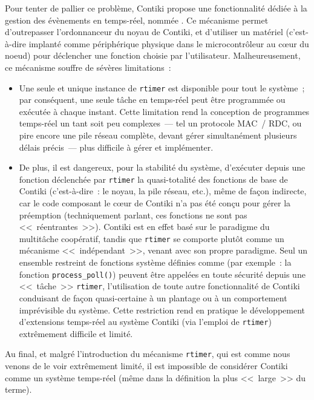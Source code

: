 Pour tenter de pallier ce problème, Contiki propose une fonctionnalité
dédiée à la gestion des évènements en temps-réel, nommée
. Ce mécanisme permet d'outrepasser l'ordonnanceur
du noyau de Contiki, et d'utiliser un  matériel (c'est-à-dire
implanté comme périphérique physique dans le microcontrôleur au c{\oe}ur
du noeud) pour déclencher une fonction choisie par l'utilisateur.
Malheureusement, ce mécanisme souffre de sévères limitations~:

\begin{itemize}

\item Une seule et unique instance de \texttt{rtimer} est disponible pour
tout le système~; par conséquent, une seule tâche en temps-réel peut être
programmée ou exécutée à chaque instant. Cette limitation rend la
conception de programmes temps-réel un tant soit peu complexes~---
tel un protocole MAC~/ RDC, ou pire encore une pile réseau complète,
devant gérer simultanément plusieurs délais précis~--- plus difficile
à gérer et implémenter.

\item De plus, il est dangereux, pour la stabilité du système, d'exécuter
depuis une fonction déclenchée par \texttt{rtimer} la quasi-totalité
des fonctions de base de Contiki (c'est-à-dire~: le noyau, la pile réseau,
etc.), même de façon indirecte, car le code composant le c{\oe}ur de Contiki
n'a pas été conçu pour gérer la préemption (techniquement parlant, ces
fonctions ne sont pas <<~réentrantes~>>). Contiki est en effet basé sur
le paradigme du multitâche coopératif, tandis que \texttt{rtimer} se
comporte plutôt comme un mécanisme <<~indépendant~>>, venant avec son
propre paradigme. Seul un ensemble restreint de fonctions système définies
comme  (par exemple~: la fonction
\texttt{process\_poll()}) peuvent être appelées en toute sécurité depuis
une <<~tâche~>> \texttt{rtimer}, l'utilisation de toute autre fonctionnalité
de Contiki conduisant de façon quasi-certaine à un plantage ou à un
comportement imprévisible du système. Cette restriction rend en pratique
le développement d'extensions temps-réel au système Contiki (via l'emploi
de \texttt{rtimer}) extrêmement difficile et limité.

\end{itemize}

Au final, et malgré l'introduction du mécanisme \texttt{rtimer}, qui est
comme nous venons de le voir extrêmement limité, il est impossible de
considérer Contiki comme un système temps-réel (même dans la définition
la plus <<~large~>> du terme).

